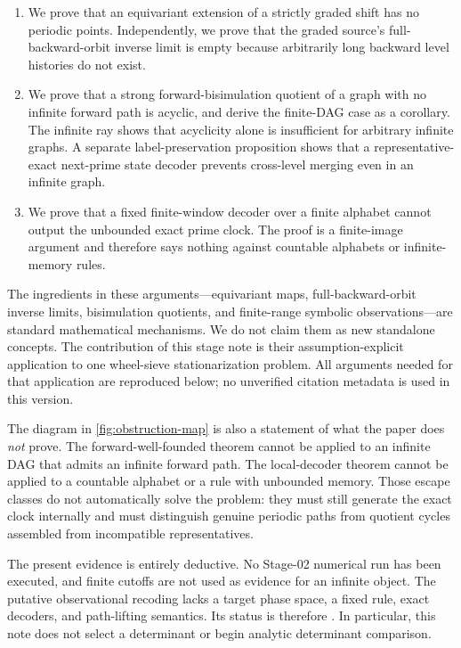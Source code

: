 \begin{enumerate}[label=\textbf{C\arabic*.}]
  \item We prove that an equivariant extension of a strictly graded shift has
  no periodic points.  Independently, we prove that the graded source's
  full-backward-orbit inverse limit is empty because arbitrarily long
  backward level histories do not exist.

  \item We prove that a strong forward-bisimulation quotient of a graph with
  no infinite forward path is acyclic, and derive the finite-DAG case as a
  corollary.  The infinite ray shows that acyclicity alone is insufficient
  for arbitrary infinite graphs.  A separate label-preservation proposition
  shows that a representative-exact next-prime state decoder prevents
  cross-level merging even in an infinite graph.

  \item We prove that a fixed finite-window decoder over a finite alphabet
  cannot output the unbounded exact prime clock.  The proof is a finite-image
  argument and therefore says nothing against countable alphabets or
  infinite-memory rules.
\end{enumerate}

The ingredients in these arguments---equivariant maps, full-backward-orbit
inverse limits, bisimulation quotients, and finite-range symbolic
observations---are standard mathematical mechanisms.  We do not claim them
as new standalone concepts.  The contribution of this stage note is their
assumption-explicit application to one wheel-sieve stationarization problem.
All arguments needed for that application are reproduced below; no
unverified citation metadata is used in this version.



The diagram in \cref{fig:obstruction-map} is also a statement of what the
paper does \emph{not} prove.  The forward-well-founded theorem cannot be
applied to an infinite DAG that admits an infinite forward path.  The
local-decoder theorem cannot be
applied to a countable alphabet or a rule with unbounded memory.  Those
escape classes do not automatically solve the problem: they must still
generate the exact clock internally and must distinguish genuine periodic
paths from quotient cycles assembled from incompatible representatives.

The present evidence is entirely deductive.  No Stage-02 numerical run has
been executed, and finite cutoffs are not used as evidence for an infinite
object.  The putative observational recoding lacks a target phase space, a
fixed rule, exact decoders, and path-lifting semantics.  Its status is
therefore \notestable.  In particular, this note does not select a
determinant or begin analytic determinant comparison.

